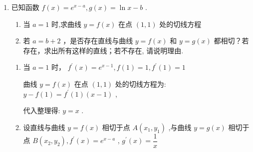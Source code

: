 \begin{enumerate}
\begin{enumerate}
\begin{jieda}
            所以曲线 $y = \sqrt{x}$ 在 $\left( {4,2}\right)$ 处的切线方程为 $y - 2 = \dfrac{1}{4}\left( {x - 4}\right)$，即 $x - {4y} + 4 = 0$ .
            
            $y = a{{e}}^{x}$ 的导数 ${y}^{\prime } = a{{e}}^{x}$ ,设直线 $x - {4y} + 4 = 0$ 与曲线 $y = a{{e}}^{x}$ 切于点 $\left( {{x}_{0},a{{e}}^{{x}_{0}}}\right)$ ,
            
            则曲线 $y = a{{e}}^{x}$ 在点 $\left( {{x}_{0},a{{e}}^{{x}_{0}}}\right)$ 处的切线方程为 $y - a{{e}}^{{x}_{0}} = a{{e}}^{{x}_{0}}\left( {x - {x}_{0}}\right)$ ,
            
            即 $x - \dfrac{1}{a{{e}}^{{x}_{0}}}y + 1 - {x}_{0} = 0$ ,所以 $\left\{  \begin{array}{l} \dfrac{1}{a{{e}}^{{x}_{0}}} = 4, \\  1 - {x}_{0} = 4, \end{array}\right.$ 解得 $a = \dfrac{{{e}}^{3}}{4}$ .
        \end{jieda}
        
        \item 已知函数 $f\left( x\right)  = {e}^{x - a},g\left( x\right)  = \ln x - b$ .
        \begin{enumerate}
            \item 当 $a = 1$ 时,求曲线 $y = f\left( x\right)$ 在点 $\left( {1,1}\right)$ 处的切线方程
            \item 若 $a = b + 2$ ，是否存在直线与曲线 $y = f\left( x\right)$ 和 $y = g\left( x\right)$ 都相切？若存在，求出所有这样的直线；若不存在, 请说明理由.
        \end{enumerate}
        
        \begin{jieda}
            \begin{enumerate}
                \item 当 $a = 1$ 时， ${f}^{\prime }\left( x\right)  = {e}^{x - 1},f\left( 1\right)  = 1,{f}^{\prime }\left( 1\right)  = 1$
                
                曲线 $y = f\left( x\right)$ 在点 $\left( {1,1}\right)$ 处的切线方程为: $y - f\left( 1\right)  = {f}^{\prime }\left( 1\right) \left( {x - 1}\right)$ ,
                
                代入整理得: $y = x$ .
                \item 设直线与曲线 $y = f\left( x\right)$ 相切于点 $A\left( {{x}_{1},{y}_{1}}\right)$ ,与曲线 $y = g\left( x\right)$ 相切于点 $B\left( {{x}_{2},{y}_{2}}\right) ,{f}^{\prime }\left( x\right)  = {e}^{x - a}$ , ${g}^{\prime }\left( x\right)  = \dfrac{1}{x}$
                

\end{enumerate}
\end{jieda}
\end{enumerate}
\end{enumerate}

